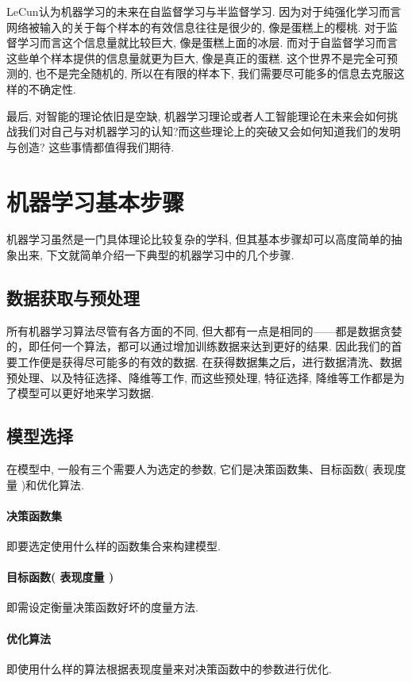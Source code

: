 \documentclass[lang=cn,11pt,a4paper]{elegantpaper}
\begin{document}
LeCun认为机器学习的未来在自监督学习与半监督学习. 因为对于纯强化学习而言网络被输入的关于每个样本的有效信息往往是很少的, 像是蛋糕上的樱桃. 对于监督学习而言这个信息量就比较巨大, 像是蛋糕上面的冰层. 而对于自监督学习而言这些单个样本提供的信息量就更为巨大, 像是真正的蛋糕. 这个世界不是完全可预测的, 也不是完全随机的, 所以在有限的样本下, 我们需要尽可能多的信息去克服这样的不确定性.

最后, 对智能的理论依旧是空缺, 机器学习理论或者人工智能理论在未来会如何挑战我们对自己与对机器学习的认知?而这些理论上的突破又会如何知道我们的发明与创造? 这些事情都值得我们期待.

\section{机器学习基本步骤}
机器学习虽然是一门具体理论比较复杂的学科, 但其基本步骤却可以高度简单的抽象出来, 下文就简单介绍一下典型的机器学习中的几个步骤.
\subsection{数据获取与预处理}
所有机器学习算法尽管有各方面的不同, 但大都有一点是相同的——都是数据贪婪的，即任何一个算法，都可以通过增加训练数据来达到更好的结果. 因此我们的首要工作便是获得尽可能多的有效的数据. 在获得数据集之后，进行数据清洗、数据预处理、以及特征选择、降维等工作, 而这些预处理, 特征选择, 降维等工作都是为了模型可以更好地来学习数据.
\subsection{模型选择}
在模型中, 一般有三个需要人为选定的参数, 它们是决策函数集、目标函数( 表现度量 )和优化算法.
\paragraph{决策函数集}即要选定使用什么样的函数集合来构建模型.
\paragraph{目标函数( 表现度量 )}即需设定衡量决策函数好坏的度量方法.
\paragraph{优化算法}即使用什么样的算法根据表现度量来对决策函数中的参数进行优化. 
\newpage
\appendix
{}
\end{document}
